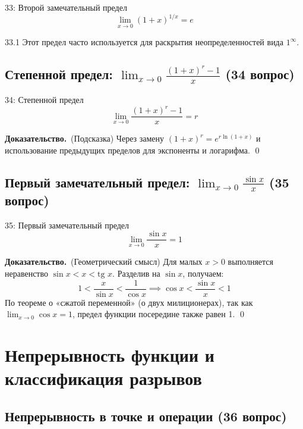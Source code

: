 \documentclass[a4paper,12pt]{article}
\newcommand{\tsubsection}[2]{\subsection[#1]{\texorpdfstring{#2}{#1}}}
\newcommand{\myproof}{\textbf{Доказательство.}\ }
\begin{document}
	\begin{theorembox}{33: Второй замечательный предел}
		\[ \lim_{x \rightarrow 0} (1+x)^{1/x} = e \]
	\end{theorembox}
	
	\begin{remarkbox}{33.1}
		Этот предел часто используется для раскрытия неопределенностей вида $1^\infty$.
	\end{remarkbox}
	
	
	
	\vspace{1cm}
	\tsubsection{Степенной предел (34 вопрос)}{Степенной предел: $\lim_{x \rightarrow 0} \frac{(1+x)^r - 1}{x}$ (34 вопрос)}
	
	\begin{theorembox}{34: Степенной предел}
		\[ \lim_{x \rightarrow 0} \frac{(1+x)^r - 1}{x} = r \]
	\end{theorembox}
	
	\myproof (Подсказка)
	Через замену $(1+x)^r = e^{r \ln(1+x)}$ и использование предыдущих пределов для экспоненты и логарифма. \qed
	
	
	
	
	\vspace{1cm}
	\tsubsection{Первый замечательный предел (35 вопрос)}{Первый замечательный предел: $\lim_{x \rightarrow 0} \frac{\sin x}{x}$ (35 вопрос)}
	
	\begin{theorembox}{35: Первый замечательный предел}
		\[ \lim_{x \rightarrow 0} \frac{\sin x}{x} = 1 \]
	\end{theorembox}
	
	\myproof (Геометрический смысл)
	Для малых $x > 0$ выполняется неравенство $\sin x < x < \text{tg } x$.
	Разделив на $\sin x$, получаем:
	\[ 1 < \frac{x}{\sin x} < \frac{1}{\cos x} \implies \cos x < \frac{\sin x}{x} < 1 \]
	По теореме о «сжатой переменной» (о двух милиционерах), так как $\lim_{x \rightarrow 0} \cos x = 1$, предел функции посередине также равен 1. \qed
		







	\newpage
	\section{Непрерывность функции и классификация разрывов}
	
	\subsection{Непрерывность в точке и операции (36 вопрос)}
	
\end{document}
